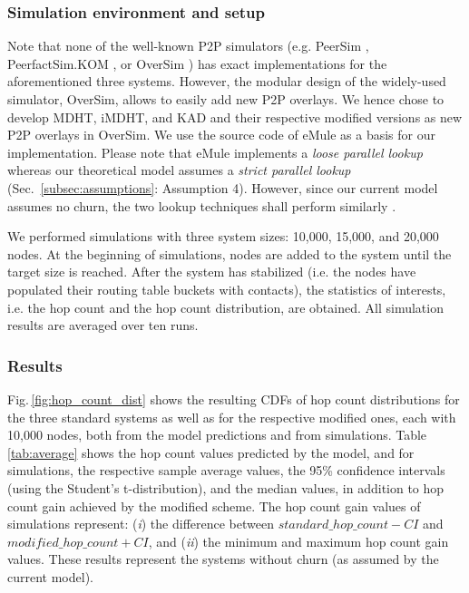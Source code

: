 \documentclass[10pt, conference, compsocconf, letterpaper]{IEEEtran}
\begin{document}
\vspace{3pt}
\subsubsection{\textbf{Simulation environment and setup}} Note that none of the well-known P2P simulators (e.g. PeerSim \cite{Montresor09peersim}, PeerfactSim.KOM \cite{stingl11peerfactsim}, or OverSim \cite{baumgart07oversim}) has exact implementations for the aforementioned three systems. However, the modular design of the widely-used simulator, OverSim, allows to easily add new P2P overlays. We hence chose to develop MDHT, iMDHT, and KAD and their respective modified versions as new P2P overlays in OverSim. We use the source code of eMule as a basis for our implementation. Please note that eMule implements a \emph{loose parallel lookup} whereas our theoretical model assumes a
\emph{strict parallel lookup} (Sec.~\ref{subsec:assumptions}: Assumption 4). However, since our current model assumes no churn, the two lookup techniques shall perform similarly \cite{stutzbach06improving}. 

We performed simulations with three system sizes: 10,000, 15,000, and 20,000 nodes. At the beginning of simulations, nodes are added to the system until the target size is reached. After the system has stabilized (i.e. the nodes have populated their routing table buckets with contacts), the statistics of interests, i.e. the hop count and the hop count distribution, are obtained. All simulation results are averaged over ten runs.



\vspace{3pt}
\subsubsection{\textbf{Results}} Fig.\,\ref{fig:hop_count_dist} shows the resulting CDFs of hop count distributions for the three standard systems as well as for the respective modified ones, each with 10,000 nodes, both from the model predictions and from simulations. Table \,\ref{tab:average} shows the hop count values predicted by the model, and for simulations, the respective sample average values, the 95\% confidence intervals (using the Student's t-distribution), and the median values, in addition to hop count gain achieved by the modified scheme. The hop count gain values of simulations represent: (\emph{i}) the difference between $standard\_hop\_count - CI$ and $modified\_hop\_count + CI$, and (\emph{ii}) the minimum and maximum hop count gain values. These results represent the systems without churn (as assumed by the current model).
\end{document}
